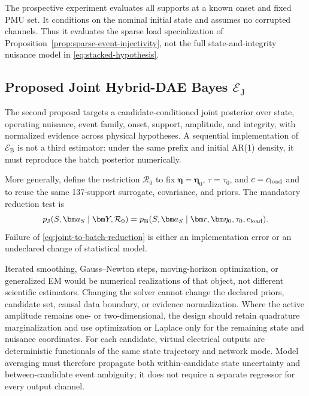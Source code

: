 The prospective experiment evaluates all \GlobalHypothesisCount{} supports at a known onset and fixed PMU set. It conditions on the nominal initial state and assumes no corrupted channels. Thus it evaluates the sparse load specialization of Proposition~\ref{prop:sparse-event-injectivity}, not the full state-and-integrity nuisance model in \eqref{eq:stacked-hypothesis}.

\subsection{Proposed Joint Hybrid-DAE Bayes $\mathcal E_{\mathrm J}$}

The second proposal targets a candidate-conditioned joint posterior over state,
operating nuisance, event family, onset, support, amplitude, and integrity, with
normalized evidence across physical hypotheses. A sequential implementation of
$\mathcal E_{\mathrm B}$ is not a third estimator: under the same prefix and
initial AR(1) density, it must reproduce the batch posterior numerically.

More generally, define the restriction $\mathcal R_0$ to fix
$\bm\eta=\bm\eta_0$, $\tau=\tau_0$, and $c=c_{\rm load}$ and to reuse the same
137-support surrogate, covariance, and priors. The mandatory reduction test is
\begin{equation}
 p_{\mathrm J}(S,\bm a_S\mid\bm Y,\mathcal R_0)
 =p_{\mathrm B}(S,\bm a_S\mid\bm r,\bm\eta_0,\tau_0,c_{\rm load}).
 \label{eq:joint-to-batch-reduction}
\end{equation}
Failure of \eqref{eq:joint-to-batch-reduction} is either an implementation error
or an undeclared change of statistical model.

Iterated smoothing,
Gauss--Newton steps, moving-horizon optimization, or generalized EM would be
numerical realizations of that object, not different scientific estimators.
Changing the solver cannot change the declared priors, candidate set, causal
data boundary, or evidence normalization.
Where the active amplitude remains one- or two-dimensional, the design should
retain quadrature marginalization and use optimization or Laplace only for the
remaining state and nuisance coordinates. For each candidate, virtual electrical outputs are deterministic functionals of
the same state trajectory and network mode. Model averaging must therefore
propagate both within-candidate state uncertainty and between-candidate event
ambiguity; it does not require a separate regressor for every output channel.


